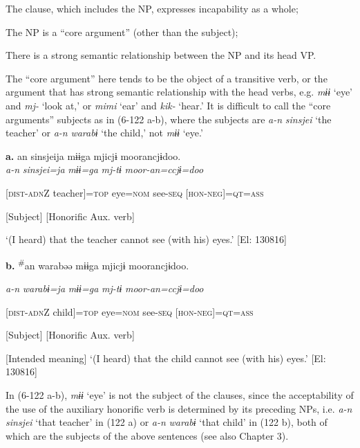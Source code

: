  \ea  The clause, which includes the NP, expresses incapability as a whole;\\
\gll

 \ex The NP is a “core argument” (other than the subject);\\
\gll

 \ex There is a strong semantic relationship between the NP and its head VP.\\
\gll

The “core argument” here tends to be the object of a transitive verb, or the argument that has strong semantic relationship with the head verbs, e.g. \textit{mɨɨ} ‘eye’ and \textit{mj-} ‘look at,’ or \textit{mimi} ‘ear’ and \textit{kik-} ‘hear.’ It is difficult to call the “core arguments” subjects as in (6-122 a-b), where the subjects are \textit{a-n} \textit{sinsjei} ‘the teacher’ or \textit{a-n} \textit{warabɨ} ‘the child,’ not \textit{mɨɨ} ‘eye.’

\ea\label{ex:6-122}
 \textbf{a.}  {\TM}  an  sinsjeija  mɨɨga  mjicjɨ  moorancjɨdoo.\\

      \textit{a-n}  \textit{sinsjei=ja}  \textit{mɨɨ=ga}  \textit{mj-tɨ}  \textit{moor-an=ccjɨ=doo}

      [\textsc{dist}-\textsc{adn}Z  teacher]=\textsc{top}  eye=\textsc{nom}  see-\textsc{seq}  [\textsc{hon}-\textsc{neg}]=\textsc{qt}=\textsc{ass}

      [Subject]      [Honorific Aux. verb]

\glt ‘(I heard) that the teacher cannot see (with his) eyes.’ [El: 130816]

  \textbf{b.}  {\TM}  \textsuperscript{\#}an  warabəə  mɨɨga  mjicjɨ  moorancjɨdoo.

       \textit{a-n}  \textit{warabɨ=ja}  \textit{mɨɨ=ga}  \textit{mj-tɨ}  \textit{moor-an=ccjɨ=doo}

      [\textsc{dist}-\textsc{adn}Z  child]=\textsc{top}  eye=\textsc{nom}  see-\textsc{seq}  [\textsc{hon}-\textsc{neg}]=\textsc{qt}=\textsc{ass}

      [Subject]      [Honorific Aux. verb]

      [Intended meaning] ‘(I heard) that the child cannot see (with his) eyes.’ [El: 130816]

In (6-122 a-b), \textit{mɨɨ} ‘eye’ is not the subject of the clauses, since the acceptability of the use of the auxiliary honorific verb is determined by its preceding NPs, i.e. \textit{a-n} \textit{sinsjei} ‘that teacher’ in (122 a) or \textit{a-n} \textit{warabɨ} ‘that child’ in (122 b), both of which are the subjects of the above sentences (see also Chapter 3).

